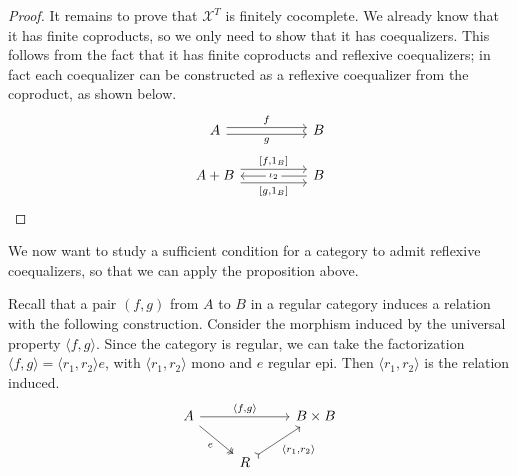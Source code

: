 \begin{subbox}{}
\begin{proof}
        It remains to prove that $\mathcal{X}^T$ is finitely cocomplete. We already know that it has finite coproducts, so we only need to show that it has coequalizers. This follows from the fact that it has finite coproducts and reflexive coequalizers; in fact each coequalizer can be constructed as a reflexive coequalizer from the coproduct, as shown below.
        \[
\begin{tikzcd}
A \arrow[rr, "f", shift left] \arrow[rr, "g"', shift right]                       &  & B                                   \\
A+B \arrow[rr, "{[f,1_B]}", shift left=2] \arrow[rr, "{[g,1_B]}"', shift right=2] &  & B \arrow[ll, "\iota_2" description]
\end{tikzcd}
        \]
    \end{proof}  
\end{subbox}

We now want to study a sufficient condition for a category to admit reflexive coequalizers, so that we can apply the proposition above.

Recall that a pair $(f,g)$ from $A$ to $B$ in a regular category induces a relation with the following construction. Consider the morphism induced by the universal property $\langle f,g \rangle$. Since the category is regular, we can take the factorization $\langle f,g \rangle = \langle r_1,r_2\rangle e$, with $\langle r_1,r_2\rangle$ mono and $e$ regular epi. Then $\langle r_1,r_2\rangle$ is the relation induced.
\[
\begin{tikzcd}
    A \arrow[rd, "e"', two heads] \arrow[rr, "{\langle f,g \rangle}"] &                                                   & B\times B \\
                                                                      & R \arrow[ru, "{\langle r_1, r_2 \rangle}"', tail] &          
    \end{tikzcd}
\]

